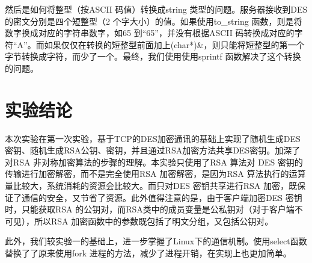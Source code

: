 \documentclass[UTF8,a4paper,10pt]{ctexart}
\begin{document}
然后是如何将整型（按ASCII 码值）转换成string 类型的问题。服务器接收到DES 的密文分别是四个短整型（2 个字大小）的值。如果使用to\_string 函数，则是将数字换成对应的字符串数字，如65 到“65”，并没有根据ASCII 码转换成对应的字符“A”。而如果仅仅在转换的短整型前面加上(char*)\&，则只能将短整型的第一个字节转换成字符，而少了一个。最终，我们使用使用sprintf 函数解决了这个转换的问题。


\section{实验结论}
本次实验在第一次实验，基于TCP的DES加密通讯的基础上实现了随机生成DES密钥、随机生成RSA公钥、密钥，并且通过RSA加密方法共享DES密钥。加深了对RSA 非对称加密算法的步骤的理解。本实验只使用了RSA 算法对
DES 密钥的传输进行加密解密，而不是完全使用RSA 加密解密，是因为RSA 算法执行的运算量比较大，系统消耗的资源会比较大。而只对DES 密钥共享进行RSA 加密，既保证了通信的安全，又节省了资源。此外值得注意的是，由于客户端加密DES 密钥时，只能获取RSA 的公钥对，而RSA类中的成员变量是公私钥对（对于客户端不可见），所以RSA 加密函数中的参数既包括了明文分组，又包括公钥对。

此外，我们较实验一的基础上，进一步掌握了Linux下的通信机制。使用select函数替换了了原来使用fork 进程的方法，减少了进程开销，在实现上也更加简单。
\end{document}
